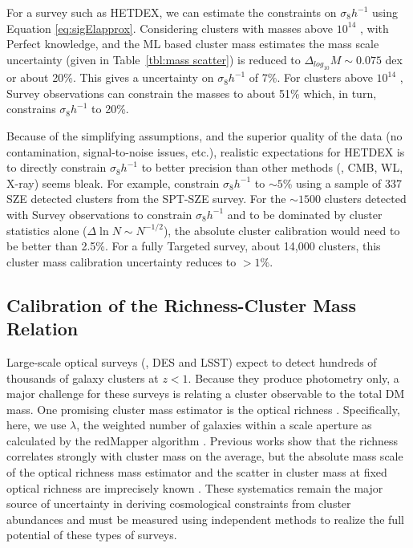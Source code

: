 \documentclass[fleqn,usenatbib]{mnras}
\begin{document}
For a survey such as HETDEX, we can estimate the constraints on $\sigma_8h^{-1}$ using Equation \ref{eq:sigElapprox}. Considering clusters with masses above $10^{14}$ \Msol, with Perfect knowledge, and the ML based cluster mass estimates the mass scale uncertainty (given in Table~\ref{tbl:mass scatter}) is reduced to $\Delta_{log_{10}}M \sim 0.075$ dex or about 20\%. This gives a uncertainty on $\sigma_8h^{-1}$ of 7\%. For clusters above $10^{14}$ \Msol, Survey observations can constrain the masses to about 51\% which, in turn, constrains $\sigma_8h^{-1}$ to 20\%.

Because of the simplifying assumptions, and the superior quality of the data (no contamination, signal-to-noise issues, etc.), realistic expectations for HETDEX is to directly constrain $\sigma_8h^{-1}$ to better precision than other methods (\eg, CMB, WL, X-ray) seems bleak. For example, \cite{deHaan2016} constrain $\sigma_8h^{-1}$ to $\sim5$\% using a sample of 337 SZE detected clusters from the SPT-SZE survey. For the $\sim1500$ clusters detected with Survey observations to constrain $\sigma_8h^{-1}$ and to be dominated by cluster statistics alone ($\Delta \ln N \sim N^{-1/2}$), the absolute cluster calibration would need to be better than 2.5\%. For a fully Targeted survey, about 14,000 clusters, this cluster mass calibration uncertainty reduces to $>1\%$.

\subsection{Calibration of the Richness-Cluster Mass Relation}
Large-scale optical surveys (\eg, DES and LSST) expect to detect hundreds of thousands of galaxy clusters at $z < 1$. Because they produce photometry only, a major challenge for these surveys is relating a cluster observable to the total DM mass. One promising cluster mass estimator is the optical richness . Specifically, here, we use $\lambda$, the weighted number of galaxies within a scale aperture  as calculated by the redMapper algorithm \citep{Rykoff2012}. Previous works  show that the richness correlates strongly with cluster mass on the average, but the absolute mass scale of the optical richness mass estimator and the scatter in cluster mass at fixed optical richness are imprecisely known \citep{Rykoff2012}. These systematics remain the major source of uncertainty in deriving cosmological constraints from cluster abundances and must be measured using independent methods to realize the full potential of these types of surveys.
\end{document}
